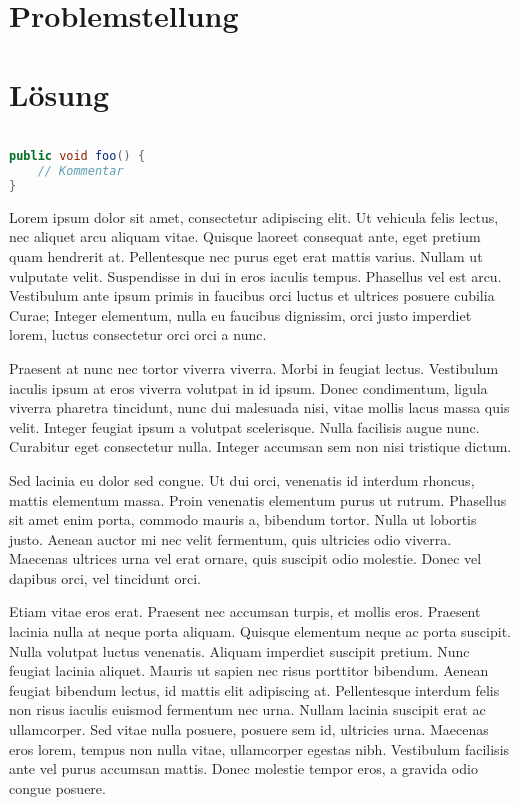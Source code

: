 \documentclass[12pt,oneside,a4paper,parskip]{scrbook}
\begin{document}
\chapter{Problemstellung}

\chapter{Lösung}

\begin{lstlisting}[label=lst:java,
				   language=java,
				   firstnumber=1,
				   caption=Beispiel für einen Quelltext]

public void foo() {
	// Kommentar
}
\end{lstlisting}

Lorem ipsum dolor sit amet, consectetur adipiscing elit. Ut vehicula felis lectus, nec aliquet arcu aliquam vitae. Quisque laoreet consequat ante, eget pretium quam hendrerit at. Pellentesque nec purus eget erat mattis varius. Nullam ut vulputate velit. Suspendisse in dui in eros iaculis tempus. Phasellus vel est arcu. Vestibulum ante ipsum primis in faucibus orci luctus et ultrices posuere cubilia Curae; Integer elementum, nulla eu faucibus dignissim, orci justo imperdiet lorem, luctus consectetur orci orci a nunc.

Praesent at nunc nec tortor viverra viverra. Morbi in feugiat lectus. Vestibulum iaculis ipsum at eros viverra volutpat in id ipsum. Donec condimentum, ligula viverra pharetra tincidunt, nunc dui malesuada nisi, vitae mollis lacus massa quis velit. Integer feugiat ipsum a volutpat scelerisque. Nulla facilisis augue nunc. Curabitur eget consectetur nulla. Integer accumsan sem non nisi tristique dictum.

Sed lacinia eu dolor sed congue. Ut dui orci, venenatis id interdum rhoncus, mattis elementum massa. Proin venenatis elementum purus ut rutrum. Phasellus sit amet enim porta, commodo mauris a, bibendum tortor. Nulla ut lobortis justo. Aenean auctor mi nec velit fermentum, quis ultricies odio viverra. Maecenas ultrices urna vel erat ornare, quis suscipit odio molestie. Donec vel dapibus orci, vel tincidunt orci.

Etiam vitae eros erat. Praesent nec accumsan turpis, et mollis eros. Praesent lacinia nulla at neque porta aliquam. Quisque elementum neque ac porta suscipit. Nulla volutpat luctus venenatis. Aliquam imperdiet suscipit pretium. Nunc feugiat lacinia aliquet. Mauris ut sapien nec risus porttitor bibendum. Aenean feugiat bibendum lectus, id mattis elit adipiscing at. Pellentesque interdum felis non risus iaculis euismod fermentum nec urna. Nullam lacinia suscipit erat ac ullamcorper. Sed vitae nulla posuere, posuere sem id, ultricies urna. Maecenas eros lorem, tempus non nulla vitae, ullamcorper egestas nibh. Vestibulum facilisis ante vel purus accumsan mattis. Donec molestie tempor eros, a gravida odio congue posuere.
\end{document}
